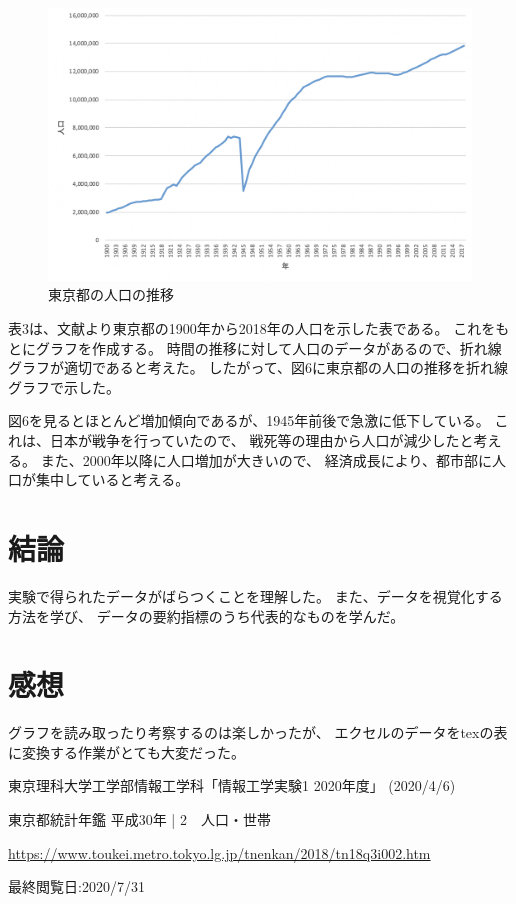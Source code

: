 \documentclass[12pt]{jarticle}
\begin{document}
\begin{figure}[h]
    \begin{center}
        \includegraphics[scale=0.8]{kadai4_graph6.png}
    \end{center}
    \caption{東京都の人口の推移}
    \label{fig6}
\end{figure}

表3は、文献\cite{paa}より東京都の1900年から2018年の人口を示した表である。
これをもとにグラフを作成する。
時間の推移に対して人口のデータがあるので、折れ線グラフが適切であると考えた。
したがって、図6に東京都の人口の推移を折れ線グラフで示した。

図6を見るとほとんど増加傾向であるが、1945年前後で急激に低下している。
これは、日本が戦争を行っていたので、
戦死等の理由から人口が減少したと考える。
また、2000年以降に人口増加が大きいので、
経済成長により、都市部に人口が集中していると考える。
\clearpage

\section{結論}
実験で得られたデータがばらつくことを理解した。
また、データを視覚化する方法を学び、
データの要約指標のうち代表的なものを学んだ。

\section{感想}
グラフを読み取ったり考察するのは楽しかったが、
エクセルのデータをtexの表に変換する作業がとても大変だった。
\begin{thebibliography}{99}
    \label{sannkoubunnkenn_chapter}
    東京理科大学工学部情報工学科「情報工学実験1 2020年度」
    (2020/4/6)

    東京都統計年鑑 平成30年 | 2　人口・世帯

    \url{https://www.toukei.metro.tokyo.lg.jp/tnenkan/2018/tn18q3i002.htm}

    最終閲覧日:2020/7/31

\end{thebibliography}

\appendix
\end{document}
